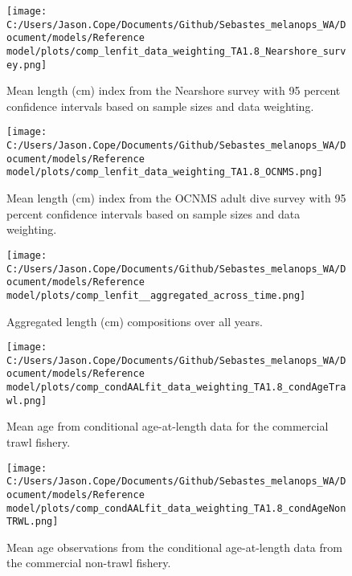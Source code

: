 \documentclass[11pt,
  english,
  letterpaper,
]{article}
\begin{document}
\pagebreak

\begin{figure}
\centering
\texttt{[image: C:/Users/Jason.Cope/Documents/Github/Sebastes\_melanops\_WA/Document/models/Reference model/plots/comp\_lenfit\_data\_weighting\_TA1.8\_Nearshore\_survey.png]}
\caption{Mean length (cm) index from the Nearshore survey with 95 percent confidence intervals based on sample sizes and data weighting.\label{fig:nearshore-mean-len-fit}}
\end{figure}

\pagebreak

\begin{figure}
\centering
\texttt{[image: C:/Users/Jason.Cope/Documents/Github/Sebastes\_melanops\_WA/Document/models/Reference model/plots/comp\_lenfit\_data\_weighting\_TA1.8\_OCNMS.png]}
\caption{Mean length (cm) index from the OCNMS adult dive survey with 95 percent confidence intervals based on sample sizes and data weighting.\label{fig:ocnms-mean-len-fit}}
\end{figure}

\pagebreak

\begin{figure}
\centering
\texttt{[image: C:/Users/Jason.Cope/Documents/Github/Sebastes\_melanops\_WA/Document/models/Reference model/plots/comp\_lenfit\_\_aggregated\_across\_time.png]}
\caption{Aggregated length (cm) compositions over all years.\label{fig:agg-len-fit}}
\end{figure}

\pagebreak

\begin{figure}
\centering
\texttt{[image: C:/Users/Jason.Cope/Documents/Github/Sebastes\_melanops\_WA/Document/models/Reference model/plots/comp\_condAALfit\_data\_weighting\_TA1.8\_condAgeTrawl.png]}
\caption{Mean age from conditional age-at-length data for the commercial trawl fishery.\label{fig:trawl-mean-caal}}
\end{figure}

\pagebreak

\begin{figure}
\centering
\texttt{[image: C:/Users/Jason.Cope/Documents/Github/Sebastes\_melanops\_WA/Document/models/Reference model/plots/comp\_condAALfit\_data\_weighting\_TA1.8\_condAgeNonTRWL.png]}
\caption{Mean age observations from the conditional age-at-length data from the commercial non-trawl fishery.\label{fig:nontrawl-mean-caal}}
\end{figure}
\end{document}
